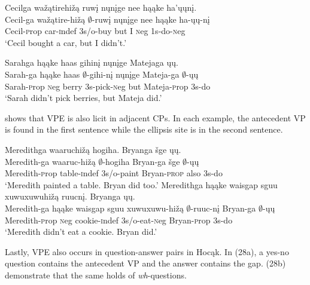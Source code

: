 \documentclass[output=paper]{LSP/langsci}
\begin{document}
\begin{exe}
\ex
\begin{xlist}
\ex
\glll Cecilga wažątirehižą ruwį nųnįge nee hąąke ha'ųųnį.\\
Cecil-ga wažątire-hižą $\emptyset$-ruwį nųnįge nee hąąke ha-ųų-nį\\
Cecil-{\textsc prop} car-{\textsc indef} {\textsc 3s/o}-buy but I {\textsc neg} {\textsc 1s}-do-{\textsc neg}\\
\trans `Cecil bought a car, but I didn't.'

\ex
\glll Sarahga hąąke haas gihinį nųnįge Matejaga ųų.\\
Sarah-ga hąąke haas $\emptyset$-gihi-nį nųnįge Mateja-ga $\emptyset$-ųų\\
Sarah-{\textsc prop} {\textsc neg} berry {\textsc 3s}-pick-{\textsc neg} but Mateja-{\textsc prop} {\textsc 3s}-do\\
\trans `Sarah didn't pick berries, but Mateja did.'
\end{xlist}
\end{exe}


 shows that VPE is also licit in adjacent CPs. In each example, the antecedent VP is found in the first sentence while the ellipsis site is in the second sentence.

\begin{exe}
\ex
\begin{xlist}
\ex
\glll Meredithga waaruchižą hogiha. Bryanga šge ųų.\\
Meredith-ga waaruc-hižą $\emptyset$-hogiha Bryan-ga šge $\emptyset$-ųų\\
Meredith-{\textsc prop} table-{\textsc indef} {\textsc 3s/o}-paint Bryan-\textsc{prop} also {\textsc 3s}-do\\
\trans `Meredith painted a table. Bryan did too.'
\ex
\glll Meredithga hąąke {waisgap sguu xuwuxuwuhižą} ruucnį. Bryanga ųų.\\
Meredith-ga hąąke {waisgap sguu xuwuxuwu-hižą} $\emptyset$-ruuc-nį Bryan-ga $\emptyset$-ųų\\
Meredith-{\textsc prop} {\textsc neg} cookie-{\textsc indef} {\textsc 3s/o}-eat-{\textsc neg} Bryan-{\textsc prop} {\textsc 3s}-do\\
\trans `Meredith didn't eat a cookie. Bryan did.'
\end{xlist}
\end{exe}

Lastly, VPE also occurs in question-answer pairs in Hocąk. In (28a), a yes-no question contains the antecedent VP and the answer contains the gap. (28b) demonstrate that the same holds of \emph{wh}-questions.
\end{document}
